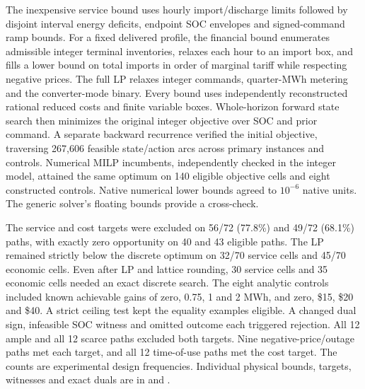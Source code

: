 \documentclass[10pt,letterpaper]{article}
\begin{document}
The inexpensive service bound uses hourly import/discharge limits followed by disjoint interval energy deficits, endpoint SOC envelopes and signed-command ramp bounds. For a fixed delivered profile, the financial bound enumerates admissible integer terminal inventories, relaxes each hour to an import box, and fills a lower bound on total imports in order of marginal tariff while respecting negative prices. The full LP relaxes integer commands, quarter-MWh metering and the converter-mode binary. Every bound uses independently reconstructed rational reduced costs and finite variable boxes. Whole-horizon forward state search then minimizes the original integer objective over SOC and prior command. A separate backward recurrence verified the initial objective, traversing 267,606 feasible state/action arcs across primary instances and controls. Numerical MILP incumbents, independently checked in the integer model, attained the same optimum on 140 eligible objective cells and eight constructed controls. Native numerical lower bounds agreed to $10^{-6}$ native units. The generic solver's floating bounds provide a cross-check.

The service and cost targets were excluded on 56/72 (77.8\%) and 49/72 (68.1\%) paths, with exactly zero opportunity on 40 and 43 eligible paths. The LP remained strictly below the discrete optimum on 32/70 service cells and 45/70 economic cells. Even after LP and lattice rounding, 30 service cells and 35 economic cells needed an exact discrete search. The eight analytic controls included known achievable gains of zero, 0.75, 1 and 2 MWh, and zero, \$15, \$20 and \$40. A strict ceiling test kept the equality examples eligible. A changed dual sign, infeasible SOC witness and omitted outcome each triggered rejection. All 12 ample and all 12 scarce paths excluded both targets. Nine negative-price/outage paths met each target, and all 12 time-of-use paths met the cost target. The counts are experimental design frequencies. Individual physical bounds, targets, witnesses and exact duals are in  and .
\end{document}
